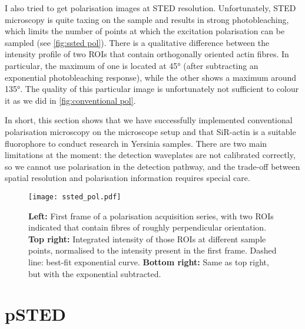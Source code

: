 I also tried to get polarisation images at STED resolution. Unfortunately, STED microscopy is quite taxing on the sample and results in strong photobleaching, which limits the number of points at which the excitation polarisation can be sampled (see \autoref{fig:ssted pol}). There is a qualitative difference between the intensity profile of two ROIs that contain orthogonally oriented actin fibres. In particular, the maximum of one is located at \ang{45} (after subtracting an exponential photobleaching response), while the other shows a maximum around \ang{135}. The quality of this particular image is unfortunately not sufficient to colour it as we did in \autoref{fig:conventional pol}.

In short, this section shows that we have successfully implemented conventional polarisation microscopy on the microscope setup and that SiR-actin is a suitable fluorophore to conduct research in Yersinia samples. There are two main limitations at the moment: the detection waveplates are not calibrated correctly, so we cannot use polarisation in the detection pathway, and the trade-off between spatial resolution and polarisation information requires special care.

\begin{figure}
	\centering
	\texttt{[image: ssted\_pol.pdf]}
	\caption{
		\textbf{Left:} First frame of a polarisation acquisition series, with two ROIs indicated that contain fibres of roughly perpendicular orientation. \textbf{Top right:} Integrated intensity of those ROIs at different sample points, normalised to the intensity present in the first frame. Dashed line: best-fit exponential curve. \textbf{Bottom right:} Same as top right, but with the exponential subtracted.
 	}
 	\label{fig:ssted pol}
\end{figure}

\section{pSTED}

